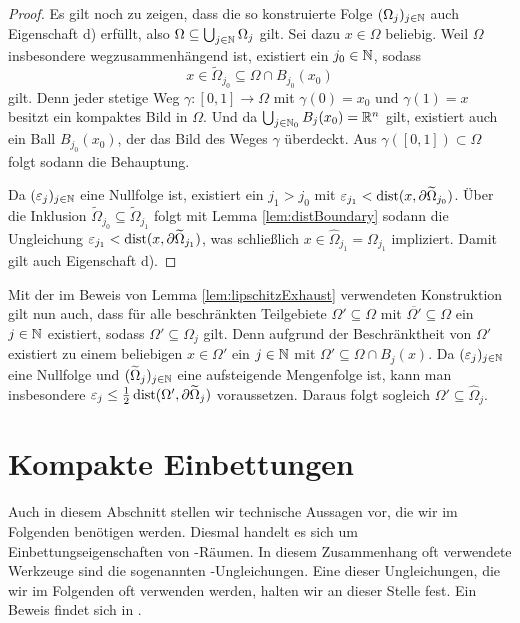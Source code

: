 \begin{proof}
  Es gilt noch zu zeigen, dass die so konstruierte Folge $(\Omega_j)_{j \in \mathbb{N}}$ auch Eigenschaft d) erfüllt, also $ \Omega \subseteq \bigcup_{j \in \mathbb{N}} \Omega_j $ gilt.
  Sei dazu $x \in \Omega$ beliebig.
  Weil $\Omega$ insbesondere wegzusammenhängend ist, existiert ein $j_0 \in \mathbb{N}$, sodass
  $$
  x \in \widetilde\Omega_{j_0} \subseteq \Omega \cap B_{j_0}(x_0)
  $$
  gilt.
  Denn jeder stetige Weg $\gamma \colon [0,1] \to \Omega$ mit $\gamma(0) = x_0$ und $\gamma(1) = x$ besitzt ein kompaktes Bild in $\Omega$.
  Und da $\bigcup_{j \in \mathbb{N}_0} B_j(x_0) = \mathbb{R}^n$ gilt, existiert auch ein Ball $B_{j_0}(x_0)$, der das Bild des Weges $\gamma$ überdeckt.
  Aus $\gamma([0,1]) \subset \Omega$ folgt sodann die Behauptung.

  Da $(\varepsilon_j)_{j \in \mathbb{N}}$ eine Nullfolge ist, existiert ein $j_1 > j_0$ mit $\varepsilon_{j_1} < \operatorname{dist}(x, \partial\widetilde\Omega_{j_0})$.
  Über die Inklusion $\widetilde\Omega_{j_0} \subseteq \widetilde\Omega_{j_1}$ folgt mit Lemma \ref{lem:distBoundary} sodann die Ungleichung $\varepsilon_{j_1} < \operatorname{dist}(x,\partial\widetilde\Omega_{j_1})$, was schließlich $x \in \widehat\Omega_{j_1} = \Omega_{j_1}$ impliziert.
  Damit gilt auch Eigenschaft d).
\end{proof}

\begin{bemnumber}
  \label{bem:boundedSubset}
  Mit der im Beweis von Lemma \ref{lem:lipschitzExhaust} verwendeten Konstruktion gilt nun auch, dass für alle beschränkten Teilgebiete $\Omega' \subseteq \Omega$ mit $\overline{\Omega'} \subseteq \Omega$ ein $j \in \mathbb{N}$ existiert, sodass $\Omega' \subseteq \Omega_j$ gilt.
  Denn aufgrund der Beschränktheit von $\Omega'$ existiert zu einem beliebigen $x \in \Omega'$ ein $j \in \mathbb{N}$ mit $\Omega' \subseteq \Omega \cap B_j(x)$.
  Da $(\varepsilon_j)_{j \in \mathbb{N}}$ eine Nullfolge und $(\widetilde\Omega_j)_{j \in \mathbb{N}}$ eine aufsteigende Mengenfolge ist, kann man insbesondere $\varepsilon_j \leq \tfrac{1}{2} \operatorname{dist}(\Omega', \partial\widetilde\Omega_j)$ voraussetzen.
  Daraus folgt sogleich $\Omega' \subseteq \widehat\Omega_j$.
\end{bemnumber}

\section{Kompakte Einbettungen}

Auch in diesem Abschnitt stellen wir technische Aussagen vor, die wir im Folgenden benötigen werden.
Diesmal handelt es sich um Einbettungseigenschaften von \sobolev\hyp{}Räumen.
In diesem Zusammenhang oft verwendete Werkzeuge sind die sogenannten \poincare\hyp{}Ungleichungen.
Eine dieser Ungleichungen, die wir im Folgenden oft verwenden werden, halten wir an dieser Stelle fest. Ein Beweis findet sich in \cite[S.183, Theorem 6.30]{adams2003sobolev}.

